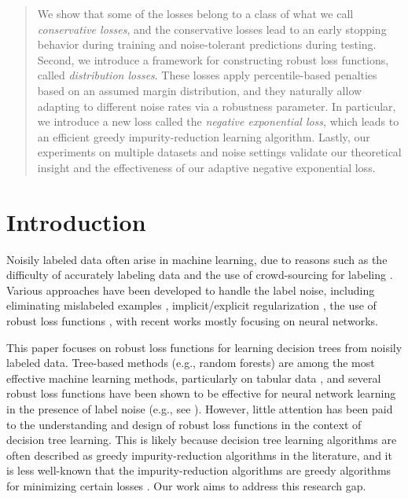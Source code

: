 \documentclass[letterpaper]{article} %
\begin{document}
\begin{abstract}
	We show that some of the losses belong to a class of what we call
	\emph{conservative losses},
    and the conservative losses %
    lead to
	an early stopping behavior during training and noise-tolerant predictions
	during testing.
	Second, we introduce a framework for constructing robust loss functions,
	called \emph{distribution losses}.
	These losses apply percentile-based penalties based on an assumed margin
	distribution, and they naturally allow adapting to different noise rates via a
	robustness parameter.
	In particular, we introduce a new loss called the \emph{negative exponential loss},
	which leads to an efficient greedy impurity-reduction learning
	algorithm.
	Lastly, our experiments on multiple datasets and noise settings validate our
	theoretical insight and the effectiveness of our adaptive negative exponential
	loss.
\end{abstract}



\section{Introduction}

Noisily labeled data often arise in machine learning, due to reasons such as
the difficulty of accurately labeling data and
the use of crowd-sourcing for labeling \cite{song2022learning}.
Various approaches have been developed to handle the label noise, including
eliminating mislabeled examples \cite{brodley1996identifying},
implicit/explicit regularization \cite{tanno2019learning,lukasik2020does},
the use of robust loss functions \cite{manwani2013noise,yang2019robust},
with recent works mostly focusing on neural networks.

This paper focuses on robust loss functions for learning decision trees from
noisily labeled data.
Tree-based methods (e.g., random forests) are among the most effective machine
learning methods, particularly on tabular data
\cite{grinsztajn2022tree,kaggle2021state},
and several robust loss functions have been shown to be effective for neural
network learning in the presence of label noise (e.g., see
\cite{ghosh2017robust,zhang2018generalized}).
However, little attention has been paid to the understanding and design of
robust loss functions in the context of decision tree learning.
This is likely because decision tree learning algorithms are often described as
greedy impurity-reduction algorithms in the literature, and it is less
well-known that the impurity-reduction algorithms are greedy algorithms for
minimizing certain losses \cite{yang2019robust,wilton2022positive}.
Our work aims to address this research gap.
\end{document}
